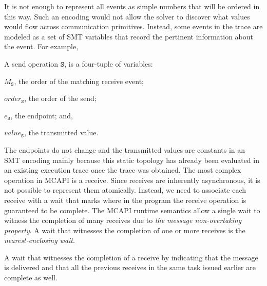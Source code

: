 It is not enough to represent all events as simple numbers
that will be ordered in this way.  Such an encoding would not allow the solver to
discover what values would flow across communication primitives. Instead, some events in the trace are modeled as a set of SMT
variables that record the pertinent information about the event. For
example,

\begin{definition}[Send] \label{def:snd}
A send operation $\mathtt{S}$, is a four-tuple of variables:
\begin{compactenum}
\item $M_\mathtt{S}$, the order of the matching receive event;

\item $\mathit{order}_\mathtt{S}$, the order of the send;

\item $e_\mathtt{S}$, the endpoint; and,

\item $\mathit{value}_\mathtt{S}$, the transmitted value.
\end{compactenum}
\end{definition}

The endpoints do not change and the transmitted values are constants in an SMT encoding mainly because this static topology has already been evaluated in an existing execution trace once the trace was obtained. The most complex operation in MCAPI is a receive. Since receives are
inherently asynchronous, it is not possible to represent them
atomically. Instead, we need to associate each receive with a wait
that marks where in the program the receive operation is guaranteed to be
complete. The MCAPI runtime semantics allow a single wait to witness the completion of many receives due to \emph{the message
  non-overtaking property}. A wait that witnesses the completion of
one or more receives is the \emph{nearest-enclosing wait}.

\begin{definition} \label{def:nw}
A wait that witnesses the completion of a receive by indicating that
the message is delivered and that all the previous receives in the
same task issued earlier are complete as well.
\end{definition}

